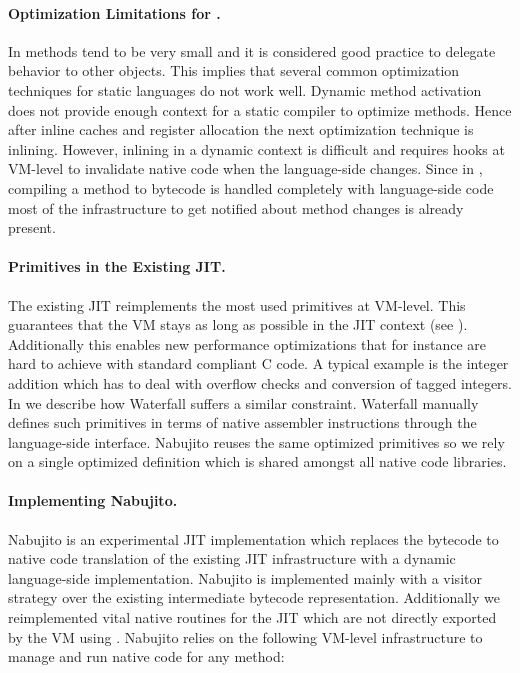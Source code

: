 \paragraph{Optimization Limitations for \PH.}
In \ST methods tend to be very small and it is considered good practice to delegate behavior to other objects.
This implies that several common optimization techniques for static languages do not work well.
Dynamic method activation does not provide enough context for a static compiler to optimize methods.
Hence after inline caches and register allocation the next optimization technique is inlining.
However, inlining in a dynamic context is difficult and requires hooks at VM-level to invalidate native code when the language-side changes.
Since in \PH, compiling a method to bytecode is handled completely with language-side code most of the infrastructure to get notified about method changes is already present.

\paragraph{Primitives in the Existing JIT.}
The existing JIT reimplements the most used primitives at VM-level.
This guarantees that the VM stays as long as possible in the JIT context (see ). Additionally this enables new performance optimizations that for instance are hard to achieve with standard compliant C code.
A typical example is the integer addition which has to deal with overflow checks and conversion of tagged integers.
In  we describe how Waterfall suffers a similar constraint. Waterfall manually defines such primitives in terms of native assembler instructions through the language-side \B interface.
Nabujito reuses the same optimized primitives so we rely on a single optimized definition which is shared amongst all native code libraries.

\paragraph{Implementing Nabujito.}
Nabujito is an experimental JIT implementation which replaces the bytecode to native code translation of the existing JIT infrastructure with a dynamic language-side implementation.
Nabujito is implemented mainly with a visitor strategy over the existing intermediate bytecode representation. 
Additionally we reimplemented vital native routines for the JIT which are not directly exported by the VM using \B. 
Nabujito relies on the following VM-level infrastructure to manage and run native code for any \PH method:

